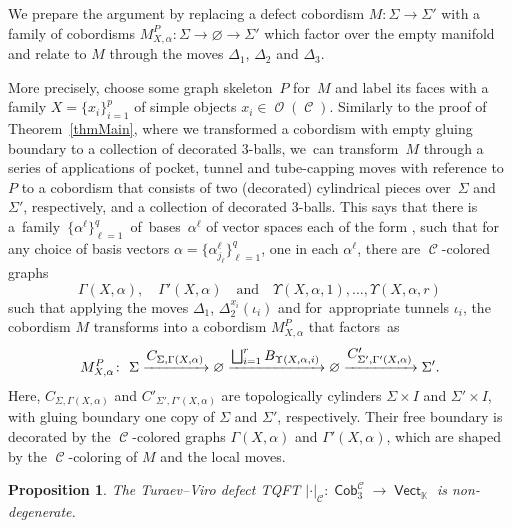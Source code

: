 \documentclass[pdftex]{sigma}
\DeclareMathOperator{\Hom}{Hom}
\DeclareMathOperator{\vect}{\mathsf{Vect}}
\DeclareMathOperator{\K}{\mathbb{K}}
\DeclareMathOperator{\Cob}{\mathsf{Cob}}
\DeclareMathOperator{\calc}{\mathcal{C}}
\DeclareMathOperator{\calo}{\mathcal{O}}
\numberwithin{equation}{section}
\newtheorem{Proposition}[Proposition]{Proposition}
\theoremstyle{definition}
\begin{document}
We prepare the argument by replacing a defect cobordism $M\colon \Sigma \rightarrow \Sigma'$ with a family of cobordisms $M^P_{X, \alpha}\colon \Sigma \rightarrow \varnothing \rightarrow \Sigma'$ which factor over the empty manifold and relate to $M$ through the moves $\Delta_1$, $\Delta_2$ and $\Delta_3$.

More precisely, choose some graph skeleton~$P$ for~$M$ and label its faces with a family ${X = \{x_i\}_{i = 1}^p}$ of simple objects $x_i \in \calo(\calc)$. Similarly to the proof of Theorem~\ref{thmMain}, where we transformed a cobordism with empty gluing boundary to a collection of decorated 3-balls, we~can transform~$M$ through a series of applications of pocket, tunnel and tube-capping moves with reference to~$P$ to a cobordism that consists of two (decorated) cylindrical pieces over~$\Sigma$ and~$\Sigma'$, respectively, and a collection of decorated 3-balls. This says that there is a~family~$\{\alpha^{\ell}\}_{\ell = 1}^q$~of~bases~$\alpha^{\ell}$ of vector spaces each of the form \smash{$\Hom_{\calc}\bigl(x_{j_1}^{\varepsilon(1)} \otimes \dots \otimes x_{j_{\ell}}^{\varepsilon(\ell)}, \mathbbm{1}\bigr)$}, such that for any choice of basis vectors $\alpha = \{\alpha_{j_{\ell}}^{\ell}\}_{\ell = 1}^q$, one in each $\alpha^{\ell}$, there are $\calc$-colored graphs
\[
\Gamma(X, \alpha) , \quad \Gamma'(X, \alpha) \quad \text{and} \quad \Upsilon(X, \alpha, 1), \dots, \Upsilon(X, \alpha, r)
\]
 such that applying the moves $\Delta_1$, $\Delta_2^{x_i}(\iota_i)$ and  for~appro\-priate tunnels $\iota_i$, the cobordism $M$ transforms into a cobordism $M_{X, \alpha}^P$ that factors~as
\begin{align} \label{eqNDFact}
 M_{X, \alpha}^P\colon \ \Sigma \xrightarrow{\mbox{\normalsize$C_{\Sigma, \Gamma(X, \alpha)}$}} \varnothing \xrightarrow{\mbox{\normalsize$\bigsqcup_{i = 1}^rB_{\Upsilon(X, \alpha, i)}$}} \varnothing \xrightarrow{\mbox{\normalsize$C'_{\Sigma', \Gamma'(X, \alpha)}$}} \Sigma'.
\end{align}
Here, $C_{\Sigma, \Gamma(X, \alpha)}$ and $C'_{\Sigma', \Gamma'(X, \alpha)}$ are topologically cylinders $\Sigma \times I$ and $\Sigma' \times I$, with gluing boundary one copy of $\Sigma$ and $\Sigma'$, respectively. Their free boundary is decorated by the $\calc$-colored graphs $\Gamma(X, \alpha)$ and $ \Gamma'(X, \alpha)$, which are shaped by the $\calc$-coloring of $M$ and the local moves.
\begin{Proposition}
 \label{propND}
 The Turaev--Viro defect TQFT $|\cdot|_{\calc}\colon \Cob_3^{\calc} \rightarrow \vect_{\K}$ is non-degenerate.
\end{Proposition}
\end{document}
